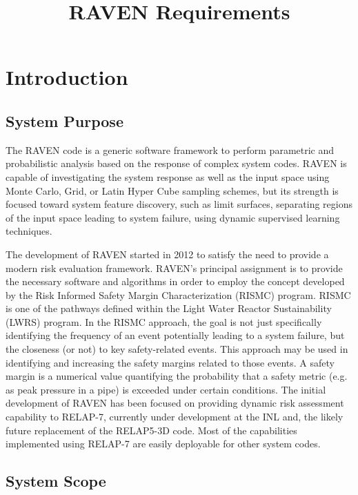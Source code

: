 \documentclass{article}
\title{RAVEN Requirements}
\begin{document}
\maketitle

\section{Introduction}

\subsection{System Purpose}

The RAVEN code is a generic software framework to perform parametric
and probabilistic analysis based on the response of complex system
codes. RAVEN is capable of investigating the system response as well
as the input space using Monte Carlo, Grid, or Latin Hyper Cube
sampling schemes, but its strength is focused toward system feature
discovery, such as limit surfaces, separating regions of the input
space leading to system failure, using dynamic supervised learning
techniques.

The development of RAVEN started in 2012 to satisfy the need to
provide a modern risk evaluation framework. RAVEN’s principal
assignment is to provide the necessary software and algorithms in
order to employ the concept developed by the Risk Informed Safety
Margin Characterization (RISMC) program. RISMC is one of the pathways
defined within the Light Water Reactor Sustainability (LWRS)
program. In the RISMC approach, the goal is not just specifically
identifying the frequency of an event potentially leading to a system
failure, but the closeness (or not) to key safety-related events. This
approach may be used in identifying and increasing the safety margins
related to those events. A safety margin is a numerical value
quantifying the probability that a safety metric (e.g. as peak
pressure in a pipe) is exceeded under certain conditions. The initial
development of RAVEN has been focused on providing dynamic risk
assessment capability to RELAP-7, currently under development at the
INL and, the likely future replacement of the RELAP5-3D code. Most of
the capabilities implemented using RELAP-7 are easily deployable for
other system codes.

\subsection{System Scope}
\end{document}
